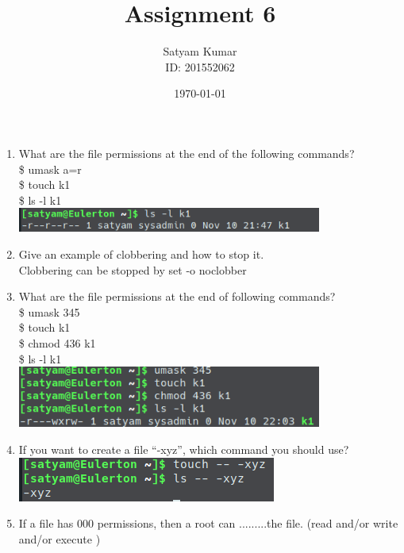 \documentclass[12pt,a4]{article}
\title{\textbf{Assignment 6}}   %
\author{Satyam Kumar \\ ID: 201552062} %
\date{\today}
\begin{document}
\maketitle
\begin{enumerate}
	\item  What are the file permissions at the end of the following commands?\\
	\$ umask a=r\\
	\$ touch k1 \\
	\$ ls -l k1\\
\includegraphics[width=10cm]{Ass62.png}
	\item  Give an example of clobbering and how to stop it.\\
Clobbering can be stopped by 	set -o noclobber
	\item What are the file permissions at the end of following commands?\\
	\$ umask 345\\
	\$ touch k1\\
	\$ chmod 436 k1\\
	\$ ls -l k1\\
	\includegraphics[width=10cm]{Ass63.png}
	\item  If you want to create a file “-xyz”, which command you should use?\\
 \includegraphics{Ass64.png}
	\item If a file has 000 permissions, then a root can .........the file. (read and/or write
	and/or execute )
	

\end{enumerate}
\end{document}
